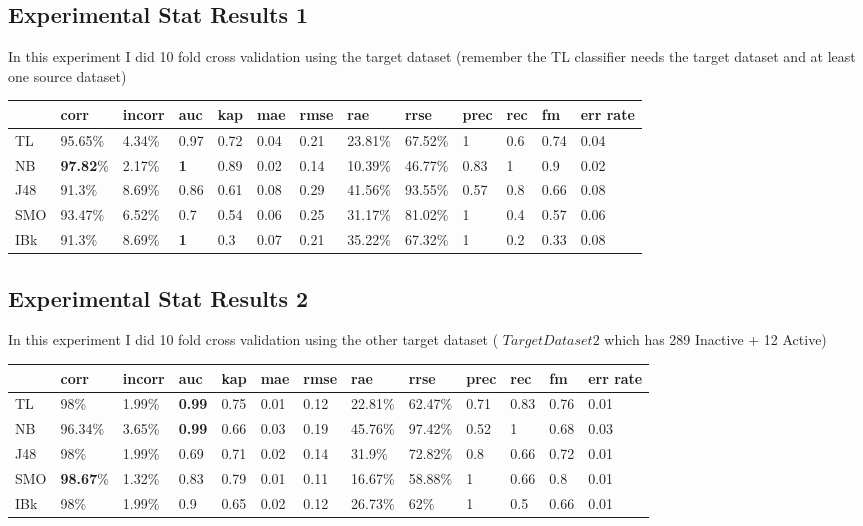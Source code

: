 \documentclass[a4paper,12pt, english]{article}
\begin{document}
\subsection{Experimental Stat Results 1}
In this experiment I did 10 fold cross validation using the target dataset (remember the TL classifier needs the target dataset and at least one source dataset)
\begin{small}
\begin{center}
    \begin{tabular}{ | l | l | l | l | l | l | l | l | l | l | l | l | l |}
    \hline
      	& corr & incorr  & auc & kap & mae & rmse & rae & rrse & prec & rec & fm & err rate\\ \hline
      	TL & 95.65\% & 4.34\% & 0.97 & 0.72 & 0.04 & 0.21 & 23.81\% & 67.52\% & 1 & 0.6 & 0.74 & 0.04\\ \hline
	NB & \textbf{97.82}\% & 2.17\% & \textbf{1} & 0.89 & 0.02 & 0.14 & 10.39\% & 46.77\% & 0.83 & 1 & 0.9 & 0.02\\ \hline
	J48 & 91.3\% & 8.69\% & 0.86 & 0.61 & 0.08 & 0.29 & 41.56\% & 93.55\% & 0.57 & 0.8 & 0.66 & 0.08\\ \hline
	SMO & 93.47\% & 6.52\% & 0.7 & 0.54 & 0.06 & 0.25 & 31.17\% & 81.02\% & 1 & 0.4 & 0.57 & 0.06\\ \hline
	IBk & 91.3\% & 8.69\% & \textbf{1} & 0.3 & 0.07 & 0.21 & 35.22\% & 67.32\% & 1 & 0.2 & 0.33 & 0.08\\ \hline  
    \end{tabular}       
\end{center}
\end{small}


\subsection{Experimental Stat Results 2}
In this experiment I did 10 fold cross validation using the other target dataset ( $Target Dataset2$ which has 289 Inactive + 12 Active)
\begin{small}
\begin{center}
    \begin{tabular}{ | l | l | l | l | l | l | l | l | l | l | l | l | l |}
    \hline
      	& corr & incorr  & auc & kap & mae & rmse & rae & rrse & prec & rec & fm & err rate\\ \hline
	TL & 98\% & 1.99\% & \textbf{0.99} & 0.75 & 0.01 & 0.12 & 22.81\% & 62.47\% & 0.71 & 0.83 & 0.76 & 0.01\\ \hline
	NB & 96.34\% & 3.65\% & \textbf{0.99} & 0.66 & 0.03 & 0.19 & 45.76\% & 97.42\% & 0.52 & 1 & 0.68 & 0.03\\ \hline
	J48 & 98\% & 1.99\% & 0.69 & 0.71 & 0.02 & 0.14 & 31.9\% & 72.82\% & 0.8 & 0.66 & 0.72 & 0.01\\ \hline
	SMO & \textbf{98.67}\% & 1.32\% & 0.83 & 0.79 & 0.01 & 0.11 & 16.67\% & 58.88\% & 1 & 0.66 & 0.8 & 0.01\\ \hline
	IBk & 98\% & 1.99\% & 0.9 & 0.65 & 0.02 & 0.12 & 26.73\% & 62\% & 1 & 0.5 & 0.66 & 0.01\\ \hline
    \end{tabular}       
\end{center}
\end{small}
\end{document}
